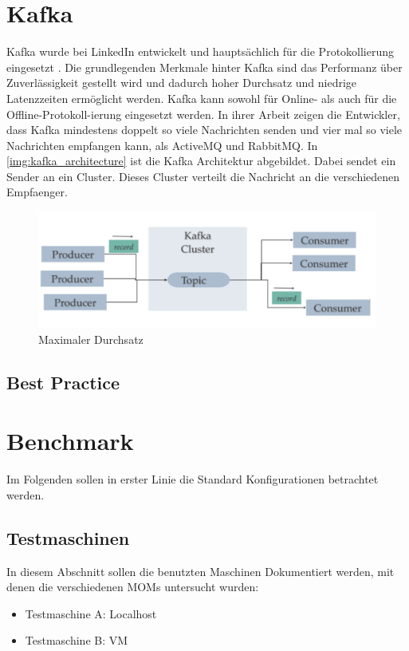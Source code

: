\section{Kafka}
Kafka wurde bei LinkedIn entwickelt und hauptsächlich für die Protokollierung eingesetzt \cite{kafka}. Die grundlegenden Merkmale hinter Kafka sind das Performanz über Zuverlässigkeit gestellt wird und dadurch hoher Durchsatz und niedrige Latenzzeiten ermöglicht werden. Kafka kann sowohl für Online- als auch für die Offline-Protokoll-ierung eingesetzt werden. In ihrer Arbeit zeigen die Entwickler, dass Kafka mindestens doppelt so viele Nachrichten senden und vier mal so viele Nachrichten empfangen kann, als ActiveMQ und RabbitMQ. In \autoref{img:kafka_architecture} ist die Kafka Architektur abgebildet. Dabei sendet ein Sender an ein Cluster. Dieses Cluster verteilt die Nachricht an die verschiedenen Empfaenger. 
\begin{figure}
\center
  \includegraphics[width=1\textwidth]{images/kafka_architecture.png}
  \caption{Maximaler Durchsatz}
  \label{img:kafka_architecture}
\end{figure}

\subsection{Best Practice}

\section{Benchmark}
Im Folgenden sollen in erster Linie die Standard Konfigurationen betrachtet werden.
\subsection{Testmaschinen}
\label{sec:testmachine}
In diesem Abschnitt sollen die benutzten Maschinen Dokumentiert werden, mit denen die verschiedenen MOMs untersucht wurden:
\begin{itemize}
    \item Testmaschine A: Localhost
    \item Testmaschine B: VM
\end{itemize}

